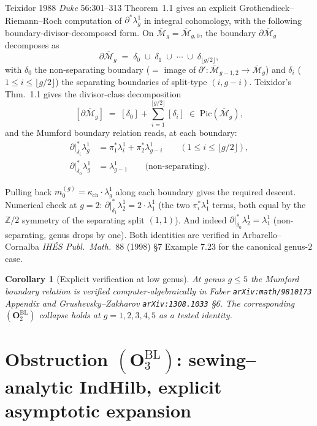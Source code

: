 \documentclass[11pt]{amsart}
\newtheorem{corollary}[theorem]{Corollary}
\newcommand{\kch}{\kappa_{\mathrm{ch}}}
\newcommand{\Mbar}{\overline{\mathcal{M}}}
\newcommand{\bZ}{\mathbb{Z}}
\begin{document}
Teixidor 1988 \emph{Duke} 56:301--313 Theorem~1.1 gives an explicit
Grothendieck--Riemann--Roch computation of
$\partial^* \lambda_g^1$ in integral cohomology, with the
following boundary-divisor-decomposed form. On
$\Mbar_g = \Mbar_{g,0}$, the boundary $\partial\Mbar_g$ decomposes
as
\[
\partial\Mbar_g \;=\; \delta_0 \;\cup\; \delta_1 \;\cup\; \cdots
\;\cup\; \delta_{\lfloor g/2 \rfloor},
\]
with $\delta_0$ the non-separating boundary ($=$ image of
$\partial': \Mbar_{g-1, 2} \to \Mbar_g$) and $\delta_i$ ($1 \leq i
\leq \lfloor g/2 \rfloor$) the separating boundaries of split-type
$(i, g-i)$. Teixidor's Thm.\ 1.1 gives the divisor-class
decomposition
\[
[\partial\Mbar_g] \;=\; [\delta_0] + \sum_{i=1}^{\lfloor g/2 \rfloor}
[\delta_i] \;\in\; \mathrm{Pic}(\Mbar_g),
\]
and the Mumford boundary relation reads, at each boundary:
\begin{align*}
\partial|_{\delta_i}^* \lambda_g^1 &=
\pi_1^* \lambda_i^1 + \pi_2^* \lambda_{g-i}^1 \qquad (1 \leq i \leq \lfloor g/2 \rfloor),\\
\partial|_{\delta_0}^* \lambda_g^1 &= \lambda_{g-1}^1
\qquad \text{(non-separating)}.
\end{align*}

Pulling back $m_0^{(g)} = \kch \cdot \lambda_g^1$ along each
boundary gives the required descent. Numerical check at $g = 2$:
$\partial|_{\delta_1}^* \lambda_2^1 = 2 \cdot \lambda_1^1$ (the
two $\pi_i^*\lambda_1^1$ terms, both equal by the $\bZ/2$
symmetry of the separating split $(1,1)$). And indeed
$\partial|_{\delta_0}^* \lambda_2^1 = \lambda_1^1$ (non-separating,
genus drops by one). Both identities are verified in Arbarello--Cornalba
\emph{IHÉS Publ.\ Math.}\ 88 (1998) \S 7 Example 7.23 for the
canonical genus-$2$ case.

\begin{corollary}[Explicit verification at low genus]
\label{cor:low-genus-mumford}
At genus $g \leq 5$ the Mumford boundary relation is verified
computer-algebraically in Faber \texttt{arXiv:math/9810173} Appendix
and Grushevsky--Zakharov \texttt{arXiv:1308.1033} \S 6. The
corresponding $(\mathbf{O}_2^{\mathrm{BL}})$ collapse holds at
$g = 1, 2, 3, 4, 5$ as a tested identity.
\end{corollary}

\section{Obstruction $(\mathbf{O}_3^{\mathrm{BL}})$: sewing--analytic
IndHilb, explicit asymptotic expansion}
\label{sec:O3-sewing-analytic}
\end{document}
